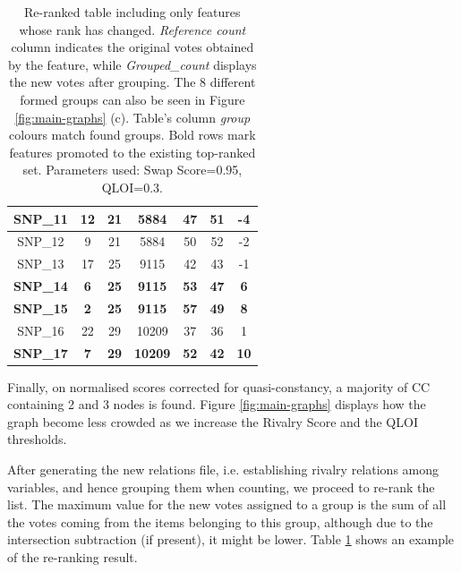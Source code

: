 \begin{table}[!hb]
{\begin{tabular}{|c|c|c|c|c|c|c|}
SNP\_11          & 12                        & 21                      & \cellcolor[HTML]{343DFA}5884           & 47                       & 51                     & -4                    \\ \hline
SNP\_12          & 9                         & 21                      & \cellcolor[HTML]{343DFA}5884           & 50                       & 52                     & -2                    \\ \hline
SNP\_13          & 17                        & 25                      & \cellcolor[HTML]{8833FB}9115           & 42                       & 43                     & -1                    \\ \hline
\textbf{SNP\_14} & \textbf{6}                & \textbf{25}             & \cellcolor[HTML]{8833FB}\textbf{9115}  & \textbf{53}              & \textbf{47}            & \textbf{6}            \\ \hline
\textbf{SNP\_15} & \textbf{2}                & \textbf{25}             & \cellcolor[HTML]{8833FB}\textbf{9115}  & \textbf{57}              & \textbf{49}            & \textbf{8}            \\ \hline
SNP\_16          & 22                        & 29                      & \cellcolor[HTML]{E62E25}10209          & 37                       & 36                     & 1                     \\ \hline
\textbf{SNP\_17} & \textbf{7}                & \textbf{29}             & \cellcolor[HTML]{E62E25}\textbf{10209} & \textbf{52}              & \textbf{42}            & \textbf{10}           \\ \hline
\end{tabular}%
}
\caption{Re-ranked table including only features whose rank has changed. \emph{Reference count} column indicates the original votes obtained by the feature, while \emph{Grouped\_count} displays the new votes after grouping. The 8 different formed groups can also be seen in Figure \ref{fig:main-graphs} (c). Table's column \emph{group} colours match found groups. Bold rows mark features promoted to the existing top-ranked set. Parameters used: Swap Score=0.95, QLOI=0.3.}
\label{tbl:rerank}
\end{table}

Finally, on normalised scores corrected for quasi-constancy, a majority of CC containing 2 and 3 nodes is found. Figure \ref{fig:main-graphs} displays how the graph become less crowded as we increase the Rivalry Score and the QLOI thresholds.

After generating the new relations file, i.e. establishing rivalry relations among variables, and hence grouping them when counting, we proceed to re-rank the list. The maximum value for the new votes assigned to a group is the sum of all the votes coming from the items belonging to this group, although due to the intersection subtraction (if present), it might be lower. Table \ref{tbl:rerank} shows an example of the re-ranking result.

